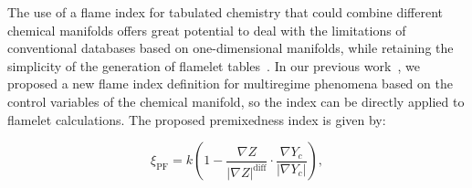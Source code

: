 \documentclass[preprint,12pt,authoryear]{elsarticle}
\begin{document}

The use of a flame index for tabulated chemistry that could combine different chemical manifolds offers great potential to deal with the limitations of conventional databases based on one-dimensional manifolds, while retaining the simplicity of the generation of flamelet tables~\citep{knudsen_capabilities_2012,kleinheinz_computational_2017,butz_local_2019}. In our previous work~\citep{illana_extended_2021}, we proposed a new flame index definition for multiregime phenomena based on the control variables of the chemical manifold, so the index can be directly applied to flamelet calculations. The proposed premixedness index is given by:



\begin{equation}
    \label{eq:zeta_PF_illana}
\xi_\mathrm{PF} = k \left( 1 - \frac{\nabla Z}{|\nabla Z|^\mathrm{diff}} \cdot \frac{\nabla Y_c}{|\nabla Y_c|} \right),
\end{equation}
\end{document}
